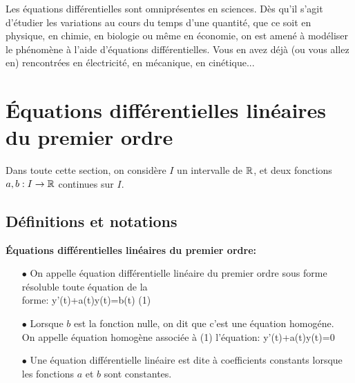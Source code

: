 \documentclass[a4paper, 11pt]{article}
\begin{document}
\noindent Les \'equations diff\'erentielles sont omnipr\'esentes en sciences. D\`es qu'il s'agit d'\'etudier les variations au cours du temps d'une quantit\'e, que ce soit en physique, en chimie, en biologie ou m\^eme en \'economie, on est amen\'e \`a mod\'eliser le ph\'enom\`ene \`a l'aide d'\'equations diff\'erentielles. Vous en avez d\'ej\`a (ou vous allez en) rencontr\'ees en \'electricit\'e, en m\'ecanique, en cin\'etique...

\section{\'Equations diff\'erentielles lin\'eaires du premier ordre}

\noindent Dans toute cette section, on consid\`{e}re $I$ un intervalle de $\mathbb{R}$, et deux fonctions $a,b: I\rightarrow \mathbb{R}$ continues sur $I$.


\subsection{D\'efinitions et notations}

 {\noindent  

\begin{defi}  \textbf{\'Equations diff\'erentielles lin\'eaires du premier ordre:}
\begin{itemize}
 \item[$\bullet$] On appelle \'equation diff\'erentielle lin\'eaire du premier ordre sous forme r\'esoluble toute \'equation de la\vsec\\
  forme: y'(t)+a(t)y(t)=b(t) (1) \vsec
\item[$\bullet$] Lorsque $b$ est la fonction nulle, on dit que c'est une équation homogéne. \vsec\\
\noindent On appelle \'equation homog\`ene associ\'ee \`a (1) l'\'equation: y'(t)+a(t)y(t)=0\\ 
 \vsec
\item[$\bullet$] Une \'equation diff\'erentielle lin\'eaire est dite \`a coefficients constants lorsque les fonctions $a$ et $b$ sont constantes. 
\end{itemize}
\end{defi}
 
}
\vsec\vsec
\end{document}
